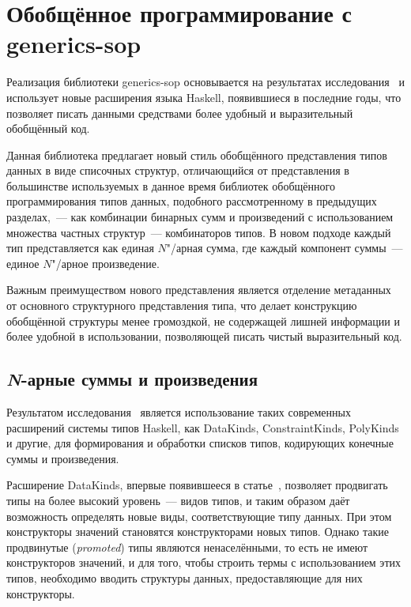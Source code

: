 \section{Обобщённое программирование с \textsf{generics-sop}}
\label{sec:generics-sop}

Реализация библиотеки \textsf{generics-sop} основывается на результатах исследования~\cite{VriLoh2014} и использует новые расширения языка Haskell, появившиеся в последние годы, что позволяет писать данными средствами более удобный и выразительный обобщённый код.

Данная библиотека предлагает новый стиль обобщённого представления типов данных в виде списочных структур, отличающийся от представления в большинстве используемых в данное время библиотек обобщённого программирования типов данных, подобного рассмотренному в предыдущих разделах,~--- как комбинации бинарных сумм и произведений с использованием множества частных структур~--- комбинаторов типов. В новом подходе каждый тип представляется как единая $N$"/арная сумма, где каждый компонент суммы~--- единое $N$"/арное произведение.

Важным преимуществом нового представления является отделение метаданных от основного структурного представления типа, что делает конструкцию обобщённой структуры менее громоздкой, не содержащей лишней информации и более удобной в использовании, позволяющей писать чистый выразительный код.

\subsection{\textsl{N}-арные суммы и произведения}

Результатом исследования~\cite{VriLoh2014} является использование таких современных расширений системы типов Haskell, как \textsf{DataKinds, ConstraintKinds, PolyKinds} и другие, для формирования и обработки списков типов, кодирующих конечные суммы и произведения.

Расширение \textsf{DataKinds}, впервые появившееся в статье~\cite{WeJo2012}, позволяет продвигать типы на более высокий уровень~--- видов типов, и таким образом даёт возможность определять новые виды, соответствующие типу данных. При этом конструкторы значений становятся конструкторами новых типов. Однако такие продвинутые (\textsl{promoted}) типы являются ненаселёнными, то есть не имеют конструкторов значений, и для того, чтобы строить термы с использованием этих типов, необходимо вводить структуры данных, предоставляющие для них конструкторы.

